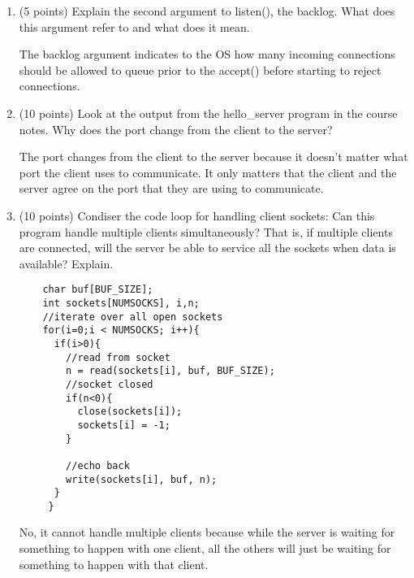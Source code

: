 \documentclass{article}[9pt]
\newenvironment{answerfont}{\fontfamily{qhv}\selectfont}{\par}
\newenvironment{myanswer}{\begin{mdframed}\begin{answerfont}}{\end{answerfont}\end{mdframed}}
\begin{document}
\begin{enumerate}
\item (5 points) Explain the second argument to listen(), the backlog. What does this argument refer to and what does it mean.

  \begin{myanswer}
  The backlog argument indicates to the OS how many incoming connections should be allowed to queue prior to the accept() before starting to reject connections.
  \end{myanswer}


\item (10 points) Look at the output from the hello_server program in the course notes. Why does the port change from the client to the server?

    \begin{myanswer}
    The port changes from the client to the server because it doesn't matter what port the client uses to communicate. It only matters that the client and the server agree on the port that they are using to communicate.
    \end{myanswer}


\item (10 points) Condiser the code loop for handling client sockets: Can this program handle multiple clients simultaneously? That is, if multiple clients are connected, will the server be able to service all the sockets when data is available? Explain.
  \begin{enumerate}
  \begin{verbatim}
    char buf[BUF_SIZE];
    int sockets[NUMSOCKS], i,n;
    //iterate over all open sockets
    for(i=0;i < NUMSOCKS; i++){
      if(i>0){
        //read from socket
        n = read(sockets[i], buf, BUF_SIZE);
        //socket closed
        if(n<0){
          close(sockets[i]);
          sockets[i] = -1;
        }

        //echo back
        write(sockets[i], buf, n);
      }
     }
  \end{verbatim}
  \end{enumerate}

  \begin{myanswer}
  No, it cannot handle multiple clients because while the server is waiting for something to happen with one client, all the others will just be waiting for something to happen with that client. 
  \end{myanswer}

\end{enumerate}
\end{document}
